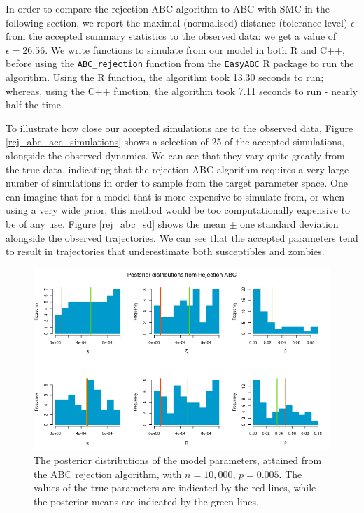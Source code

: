\documentclass[]{article}
\begin{document}
In order to compare the rejection ABC algorithm to ABC with SMC in the following section, we report the maximal (normalised) distance (tolerance level) $\epsilon$ from the accepted summary statistics to the observed data: we get a value of $\epsilon = 26.56$. We write functions to simulate from our model in both R and C++, before using the \texttt{ABC\_rejection} function from the \texttt{EasyABC} R package to run the algorithm. Using the R function, the algorithm took 13.30 seconds to run; whereas, using the C++ function, the algorithm took 7.11 seconds to run - nearly half the time.


To illustrate how close our accepted simulations are to the observed data, Figure \ref{rej_abc_acc_simulations} shows a selection of 25 of the accepted simulations, alongside the observed dynamics. We can see that they vary quite greatly from the true data, indicating that the rejection ABC algorithm requires a very large number of simulations in order to sample from the target parameter space. One can imagine that for a model that is more expensive to simulate from, or when using a very wide prior, this method would be too computationally expensive to be of any use. Figure \ref{rej_abc_sd} shows the mean $\pm$ one standard deviation alongside the observed trajectories. We can see that the accepted parameters tend to result in trajectories that underestimate both susceptibles and zombies.

\begin{figure}[H]
	\centering
	\includegraphics[width=0.95\linewidth]{../Figures/rejection_posteriors}
	\caption{The posterior distributions of the model parameters, attained from the ABC rejection algorithm, with $n=10,000$, $p=0.005$. The values of the true parameters are indicated by the red lines, while the posterior means are indicated by the green lines.}
	\label{rej_abc_posteriors}
\end{figure}
\end{document}
